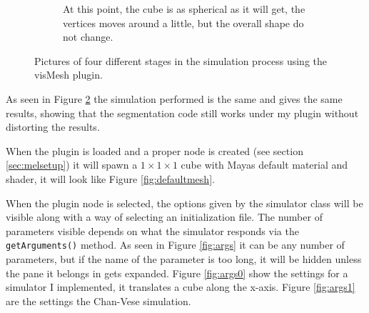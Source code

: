 \begin{figure}
\begin{subfigure}[t]{0.4\textwidth}
                \caption{At this point, the cube is as spherical as it will get,
                         the vertices moves around a little, but the overall
                         shape do not change.}
                \label{fig:Maya3}
        \end{subfigure}
        \caption{Pictures of four different stages in the simulation process using
                 the visMesh plugin.}
        \label{fig:vismesh}
\end{figure}

As seen in Figure \ref{fig:vismesh} the simulation performed is the same and
gives the same results, showing that the segmentation code still works under my
plugin without distorting the results.

When the plugin is loaded and a proper node is created (see section
\ref{sec:melsetup}) it will spawn a $1\times 1\times 1$ cube with Mayas default
material and shader, it will look like Figure \ref{fig:defaultmesh}.


When the plugin node is selected, the options given by the simulator class
will be visible along with a way of selecting an initialization file. The number
of parameters visible depends on what the simulator responds via the
\texttt{getArguments()} method. As seen in Figure \ref{fig:args} it can be any
number of parameters, but if the name of the parameter is too long, it will be
hidden unless the pane it belongs in gets expanded. Figure \ref{fig:args0}
show the settings for a simulator I implemented, it translates a cube along the
x-axis. Figure \ref{fig:args1} are the settings the Chan-Vese simulation.

